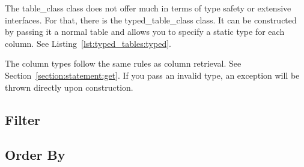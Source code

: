 The \gls{table_class} class does not offer much in terms of type safety or extensive interfaces. For that, there is the \gls{typed_table_class} class. It can be constructed by passing it a normal table and allows you to specify a static type for each column. See Listing~\ref{lst:typed_tables:typed}.



The column types follow the same rules as column retrieval. See Section~\ref{section:statement:get}. If you pass an invalid type, an exception will be thrown directly upon construction.


\subsection{Filter}

\subsection{Order By}

